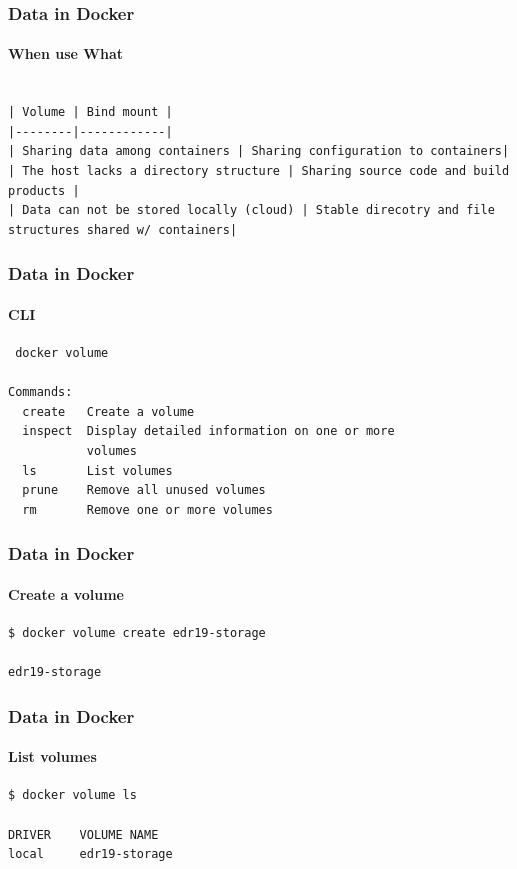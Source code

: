 
\begin{frame}[fragile]
\frametitle{Data in Docker}
\framesubtitle{When use What}

\begin{lstlisting}

| Volume | Bind mount |
|--------|------------|
| Sharing data among containers | Sharing configuration to containers|
| The host lacks a directory structure | Sharing source code and build products |
| Data can not be stored locally (cloud) | Stable direcotry and file structures shared w/ containers|

\end{lstlisting}
\end{frame}

\begin{frame}[fragile]
\frametitle{Data in Docker}
\framesubtitle{CLI}

\begin{lstlisting}
 docker volume

Commands:
  create   Create a volume
  inspect  Display detailed information on one or more
           volumes
  ls       List volumes
  prune    Remove all unused volumes
  rm       Remove one or more volumes
\end{lstlisting}
\end{frame}


\begin{frame}[fragile]
\frametitle{Data in Docker}
\framesubtitle{Create a volume}

\begin{lstlisting}
$ docker volume create edr19-storage

edr19-storage
\end{lstlisting}
\end{frame}

\begin{frame}[fragile]
\frametitle{Data in Docker}
\framesubtitle{List volumes}


\begin{lstlisting}
$ docker volume ls

DRIVER    VOLUME NAME
local     edr19-storage
\end{lstlisting}
\end{frame}


